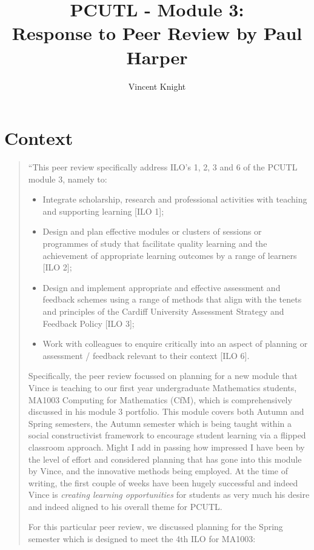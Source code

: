 \documentclass{article}
\title{PCUTL - Module 3:\\ Response to Peer Review by Paul Harper}
\author{Vincent Knight}
\date{}
\begin{document}
\maketitle

\section{Context}

\begin{quote}
``This peer review specifically address ILO's 1, 2, 3 and 6 of the PCUTL module 3, namely to:
\begin{itemize}
\item Integrate scholarship, research and professional activities with teaching and supporting learning [ILO 1];
\item Design and plan effective modules or clusters of sessions or programmes of study that facilitate quality learning and the achievement of appropriate learning outcomes by a range of learners [ILO 2];
\item Design and implement appropriate and effective assessment and feedback schemes using a range of methods that align with the tenets and principles of the Cardiff University Assessment Strategy and Feedback Policy [ILO 3];
 \item Work with colleagues to enquire critically into an aspect of planning or assessment / feedback relevant to their context [ILO 6].
\end{itemize}

Specifically, the peer review focussed on planning for a new module that Vince is teaching to our first year undergraduate Mathematics students, MA1003 Computing for Mathematics (CfM), which is comprehensively discussed in his module 3 portfolio.  This module covers both Autumn and Spring semesters, the Autumn semester which is being taught within a social constructivist framework to encourage student learning via a flipped classroom approach.  Might I add in passing how impressed I have been by the level of effort and considered planning that has gone into this module by Vince, and the innovative methods being employed.  At the time of writing, the first couple of weeks have been hugely successful and indeed Vince is \emph{creating learning opportunities} for students as very much his desire and indeed aligned to his overall theme for PCUTL.

For this particular peer review, we discussed planning for the Spring semester which is designed to meet the 4th ILO for MA1003:


\end{quote}
\end{document}

